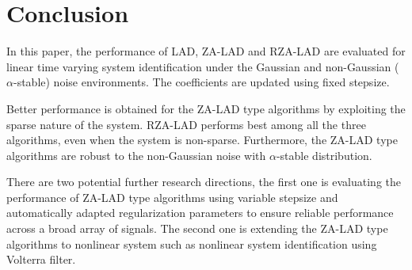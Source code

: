 \documentclass[conference]{IEEEtran}
\begin{document}
\section{Conclusion}
In this paper, the performance of LAD,  ZA-LAD and  RZA-LAD are evaluated for linear time varying system identification under the Gaussian and non-Gaussian ($\alpha$-stable)  noise environments. The coefficients are updated using fixed stepsize. 

Better performance is obtained for the ZA-LAD type algorithms by exploiting the sparse nature of the system. RZA-LAD performs best among all the three algorithms, even when the system is non-sparse. Furthermore, the ZA-LAD type algorithms are robust to the non-Gaussian noise with $\alpha$-stable distribution. 

There are two potential further research directions, the first one is evaluating the performance of ZA-LAD type algorithms using variable stepsize and automatically adapted regularization parameters to ensure reliable performance across a broad array of signals.
The second one is extending the ZA-LAD type algorithms to nonlinear system such as nonlinear system identification using Volterra filter.
\end{document}
